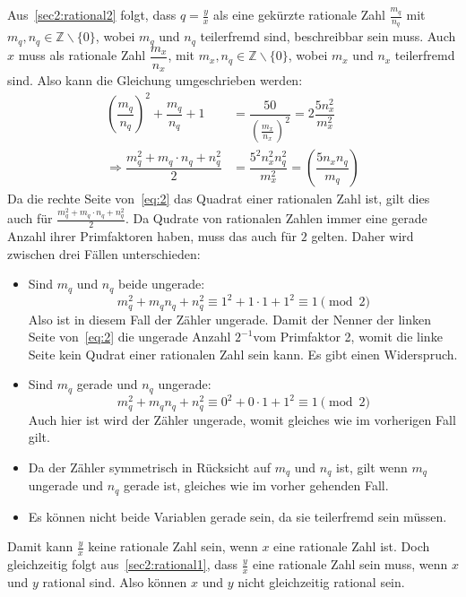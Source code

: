 \documentclass[10pt, a4paper]{amsart}
\makeatletter
\renewenvironment{proof}[1][\proofname]{\par
\pushQED{\qed}%
\normalfont \topsep6\p@\@plus6\p@\relax
\trivlist
\item\relax
{\bfseries#1}\hspace\labelsep\ignorespaces
}{%
\popQED\endtrivlist\@endpefalse
}
\makeatother
\begin{document}
\begin{proof}
  Aus~\autoref{sec2:rational2} folgt, dass $q=\frac{y}{x}$ als eine gekürzte
  rationale Zahl $\frac{m_q}{n_q}$ mit $m_q,n_q\in\mathbb{Z}\backslash\{0\}$,
  wobei $m_q$ und $n_q$ teilerfremd sind, beschreibbar sein muss. Auch $x$ muss
  als rationale Zahl $\dfrac{m_x}{n_x}$, mit
  $m_x,n_q\in\mathbb{Z}\backslash\{0\}$, wobei $m_x$ und $n_x$ teilerfremd sind.
  Also kann die Gleichung umgeschrieben werden:
  \begin{equation}
    \label{eq:2}
    \begin{split}
      \left(\dfrac{m_q}{n_q}\right)^2+\dfrac{m_q}{n_q}+1&=\dfrac{50}{\left(\frac{m_x}{n_x}\right)^2}=2\dfrac{5n_x^2}{m_x^2}\\
      \Rightarrow \dfrac{m_q^2+m_q\cdot n_q +
        n_q^2}{2}&=\dfrac{5^2n_x^2n_q^2}{m_x^2}=\left( \dfrac{5n_xn_q}{m_q}
      \right)
    \end{split}
  \end{equation}
  Da die rechte Seite von~\eqref{eq:2} das Quadrat einer rationalen Zahl ist,
  gilt dies auch für $\frac{m_q^2+m_q\cdot n_q + n_q^2}{2}$. Da Qudrate von
  rationalen Zahlen immer eine gerade Anzahl ihrer Primfaktoren haben, muss das
  auch für $2$ gelten. Daher wird zwischen drei Fällen unterschieden:
  \begin{itemize}[itemsep=2ex]
  \item Sind $m_q$ und $n_q$ beide ungerade:
    \[m_q^2+m_qn_q+n_q^2\equiv1^2+1\cdot1+1^2\equiv1\pmod{2}\] Also ist in
    diesem Fall der Zähler ungerade. Damit der Nenner der linken Seite
    von~\eqref{eq:2} die ungerade Anzahl $2^{-1}$vom Primfaktor 2, womit die
    linke Seite kein Qudrat einer rationalen Zahl sein kann. Es gibt einen
    Widerspruch.
  \item Sind $m_q$ gerade und $n_q$ ungerade:
    \[m_q^2+m_qn_q+n_q^2\equiv0^2+0\cdot1+1^2\equiv1\pmod{2}\] Auch hier ist
    wird der Zähler ungerade, womit gleiches wie im vorherigen Fall gilt.
  \item Da der Zähler symmetrisch in Rücksicht auf $m_q$ und $n_q$ ist, gilt
    wenn $m_q$ ungerade und $n_q$ gerade ist, gleiches wie im vorher gehenden
    Fall.
  \item Es können nicht beide Variablen gerade sein, da sie teilerfremd sein
    müssen.
  \end{itemize}
  Damit kann $\frac{y}{x}$ keine rationale Zahl sein, wenn $x$ eine rationale
  Zahl ist. Doch gleichzeitig folgt aus~\autoref{sec2:rational1}, dass
  $\frac{y}{x}$ eine rationale Zahl sein muss, wenn $x$ und $y$ rational sind.
  Also können $x$ und $y$ nicht gleichzeitig rational sein.
\end{proof}
\end{document}
